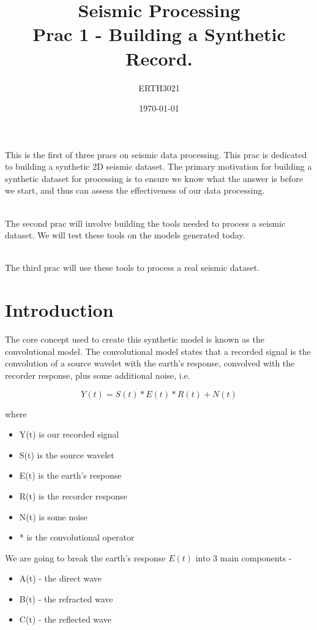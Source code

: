 \documentclass[a4paper, 10pt]{article}
\title{Seismic Processing \\ Prac 1 - Building a Synthetic Record.} %
\author{ERTH3021} %
\date{\today} %
\begin{document}
\maketitle %
This is the first of three pracs on seismic data processing.  This prac is dedicated to building a synthetic 2D seismic dataset. The primary motivation for building a synthetic dataset for processing is to ensure we know what the answer is before we start, and thus can assess the effectiveness of our data processing.  
\par~\\
The second prac will involve building the tools needed to process a seismic dataset.  We will test these tools on the models generated today.
\par~\\
The third prac will use these tools to process a real seismic dataset.

\section{Introduction}

The core concept used to create this synthetic model is known as the convolutional model. The convolutional model states that a recorded signal is the convolution of a source wavelet with the earth's response, convolved with the recorder response, plus some additional noise, i.e.

\[Y(t) =  S(t) * E(t) * R(t) + N(t)\]

where
\begin{itemize}
\item Y(t) is our recorded signal
\item S(t) is the source wavelet
\item E(t) is the earth's response
\item R(t) is the recorder response
\item N(t) is some noise
\item * is the convolutional operator
\end{itemize}

We are going to break the earth's response $E(t)$ into 3 main components - 
\begin{itemize}
\item A(t) - the direct wave
\item B(t) - the refracted wave
\item C(t) - the reflected wave
\end{itemize}
\end{document}

